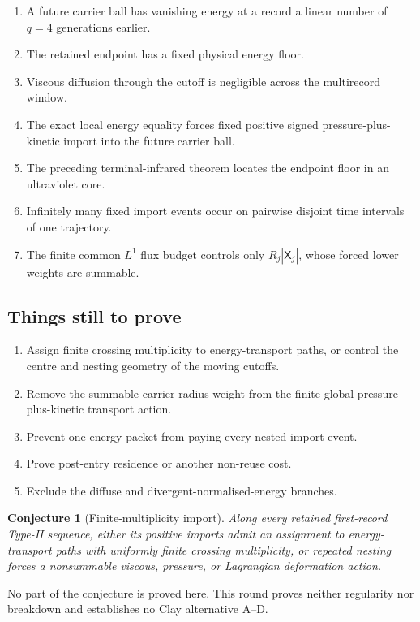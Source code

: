 \documentclass[11pt]{article}
\newtheorem{conjecture}[theorem]{Conjecture}
\theoremstyle{remark}
\begin{document}
\begin{enumerate}
\item A future carrier ball has vanishing energy at a record a linear number
of \(q=4\) generations earlier.
\item The retained endpoint has a fixed physical energy floor.
\item Viscous diffusion through the cutoff is negligible across the
multirecord window.
\item The exact local energy equality forces fixed positive signed
pressure-plus-kinetic import into the future carrier ball.
\item The preceding terminal-infrared theorem locates the endpoint floor in
an ultraviolet core.
\item Infinitely many fixed import events occur on pairwise disjoint time
intervals of one trajectory.
\item The finite common \(L^1\) flux budget controls only
\(R_j|\mathsf X_j|\), whose forced lower weights are summable.
\end{enumerate}

\subsection*{Things still to prove}

\begin{enumerate}
\item Assign finite crossing multiplicity to energy-transport paths, or
control the centre and nesting geometry of the moving cutoffs.
\item Remove the summable carrier-radius weight from the finite global
pressure-plus-kinetic transport action.
\item Prevent one energy packet from paying every nested import event.
\item Prove post-entry residence or another non-reuse cost.
\item Exclude the diffuse and divergent-normalised-energy branches.
\end{enumerate}

\begin{conjecture}[Finite-multiplicity import]
Along every retained first-record Type-II sequence, either its positive
imports admit an assignment to energy-transport paths with uniformly finite
crossing multiplicity, or repeated nesting forces a nonsummable viscous,
pressure, or Lagrangian deformation action.
\end{conjecture}

No part of the conjecture is proved here.  This round proves neither
regularity nor breakdown and establishes no Clay alternative A--D.
\end{document}
